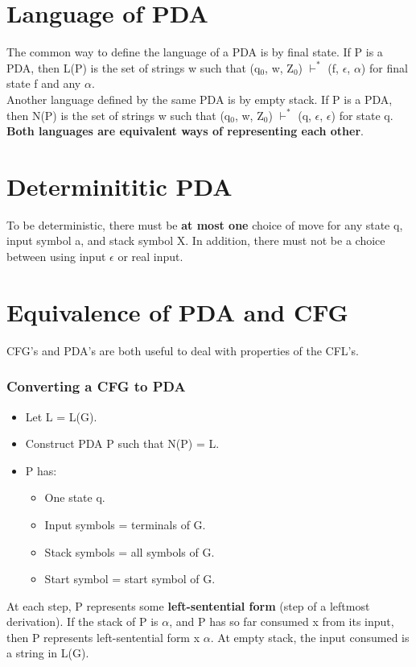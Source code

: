 \documentclass{report}
\begin{document}
\section{Language of PDA}
The common way to define the language of a PDA is by final state. If P is a PDA, then L(P) is the set of strings w such that (q$_0$, w, Z$_0$) $\vdash^*$ (f, $\epsilon$, $\alpha$) for final state f and any $\alpha$.
\\
Another language defined by the same PDA is by empty stack. If P is a PDA, then N(P) is the set of strings w such that (q$_0$, w, Z$_0$) $\vdash^*$ (q, $\epsilon$, $\epsilon$) for state q. 
\textbf{Both languages are equivalent ways of representing each other}.
\section{Determinititic PDA}
To be deterministic, there must be \textbf{at most one} choice of move for any state q, input symbol a, and stack symbol X. In addition, there must not be a choice between using input $\epsilon$ or real input.
\section{Equivalence of PDA and CFG}
CFG’s and PDA’s are both useful to deal with properties of the CFL’s.
\subsubsection{Converting a CFG to PDA}
\begin{itemize}
    \item Let L = L(G).
    \item Construct PDA P such that N(P) = L.
    \item P has:
    \begin{itemize}
        \item One state q.
        \item Input symbols = terminals of G.
        \item Stack symbols = all symbols of G.
        \item Start symbol = start symbol of G.
    \end{itemize}
\end{itemize}
At each step, P represents some \textbf{left-sentential form} (step of a leftmost derivation). If the stack of P is $\alpha$, and P has so far consumed x from its input, then P represents left-sentential form x $\alpha$. At empty stack, the input consumed is a string in L(G). \\
\end{document}
